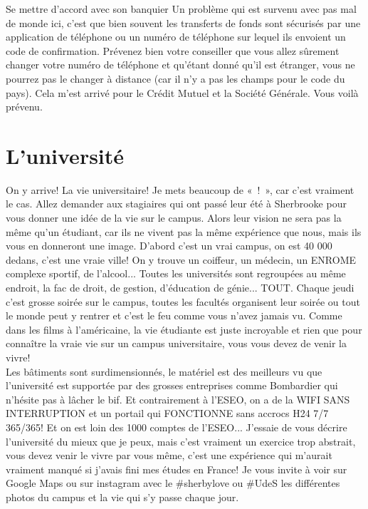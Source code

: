 \begin{example}{Se mettre d'accord avec son banquier}
  Un problème qui est survenu avec pas mal de monde ici, c'est que bien souvent les transferts de fonds sont sécurisés par une application de téléphone ou un numéro de téléphone sur lequel ils envoient un code de confirmation. Prévenez bien votre conseiller que vous allez sûrement changer votre numéro de téléphone et qu'étant donné qu'il est étranger, vous ne pourrez pas le changer à distance (car il n'y a pas les champs pour le code du pays). Cela m'est arrivé pour le Crédit Mutuel et la Société Générale. Vous voilà prévenu.
\end{example}

\section{L’université}\label{sec:sec4.7}

On y arrive! La vie universitaire! Je mets beaucoup de « ! », car c’est vraiment le cas. Allez demander aux stagiaires qui ont passé leur été à Sherbrooke pour vous donner une idée de la vie sur le campus. Alors leur vision ne sera pas la même qu’un étudiant, car ils ne vivent pas la même expérience que nous, mais ils vous en donneront une image. D’abord c’est un vrai campus, on est 40 000 dedans, c’est une vraie ville! On y trouve un coiffeur, un médecin, un ENROME complexe sportif, de l’alcool... Toutes les universités sont regroupées au même endroit, la fac de droit, de gestion, d’éducation de génie... TOUT. Chaque jeudi c’est grosse soirée sur le campus, toutes les facultés organisent leur soirée ou tout le monde peut y rentrer et c’est le feu comme vous n’avez jamais vu. Comme dans les films à l’américaine, la vie étudiante est juste incroyable et rien que pour connaître la vraie vie sur un campus universitaire, vous vous devez de venir la vivre! \\
Les bâtiments sont surdimensionnés, le matériel est des meilleurs vu que l’université est supportée par des grosses entreprises comme Bombardier qui n’hésite pas à lâcher le bif. Et contrairement à l’ESEO, on a de la WIFI SANS INTERRUPTION et un portail qui FONCTIONNE sans accrocs H24 7/7 365/365! Et on est loin des 1000 comptes de l’ESEO...
\bigbreak
J’essaie de vous décrire l’université du mieux que je peux, mais c’est vraiment un exercice trop abstrait, vous devez venir le vivre par vous même, c’est une expérience qui m’aurait vraiment manqué si j’avais fini mes études en France!
\bigbreak
Je vous invite à voir sur Google Maps ou sur instagram avec le \#sherbylove ou \#UdeS les différentes photos du campus et la vie qui s'y passe chaque jour.

